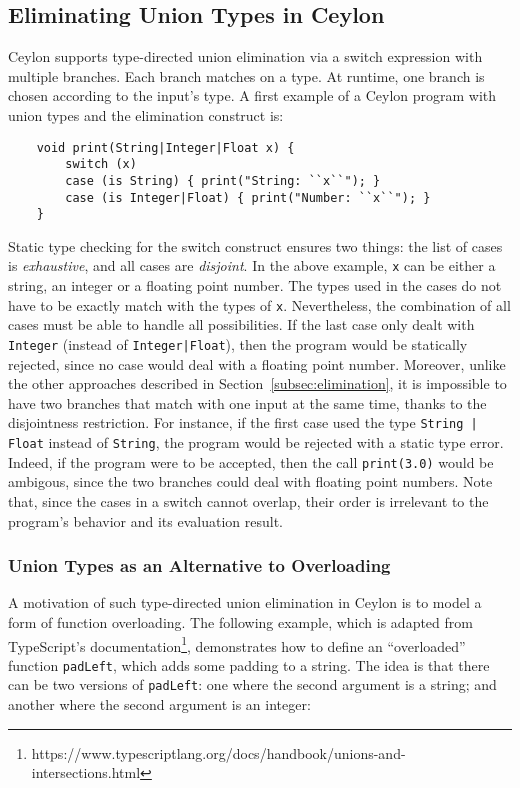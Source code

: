 \subsection{Eliminating Union Types in Ceylon}
Ceylon supports type-directed union elimination via a switch expression with
multiple branches. Each branch matches on a type.
At runtime, one branch is chosen according to the input's type.
A first example of a Ceylon program with union types and the elimination
construct is:

\begin{lstlisting}
	void print(String|Integer|Float x) {
		switch (x)
		case (is String) { print("String: ``x``"); }
		case (is Integer|Float) { print("Number: ``x``"); }
	}
\end{lstlisting}
%

Static type checking for the switch construct ensures two things: the
list of cases is \emph{exhaustive}, and all cases are
\emph{disjoint}. In the above example, \lstinline{x} can be either a
string, an integer or a floating point number. The types used in the
cases do not have to be exactly match with the types of
\lstinline{x}. Nevertheless, the combination of all cases must be
able to handle all possibilities. If the last case only dealt with
\lstinline{Integer} (instead of \lstinline{Integer|Float}), then
the program would be statically rejected, since no case would deal
with a floating point number. 
Moreover, unlike the other
approaches described in Section~\ref{subsec:elimination}, it is
impossible to have two branches that match with one input at the same
time, thanks to the disjointness restriction. For instance, if the
first case used the type \lstinline{String | Float} instead of
\lstinline{String}, the program would be rejected with a static type
error. Indeed, if the program were to be accepted, then the call
\lstinline{print(3.0)} would be ambigous, since the two branches could
deal with floating point numbers.
Note that, since the cases in a switch cannot overlap, their order is
irrelevant to the program's behavior and its evaluation result.

\subsubsection*{Union Types as an Alternative to Overloading}
A motivation of such type-directed union elimination in Ceylon is to
model a form of function overloading.
The following example, which is adapted from TypeScript's documentation\footnote{https://www.typescriptlang.org/docs/handbook/unions-and-intersections.html},
demonstrates how to define an ``overloaded'' function \lstinline{padLeft},
which adds some padding to a string. The idea is that there can be two versions
of \lstinline{padLeft}: one where the second argument is a string; and
another where the second argument is an integer:


